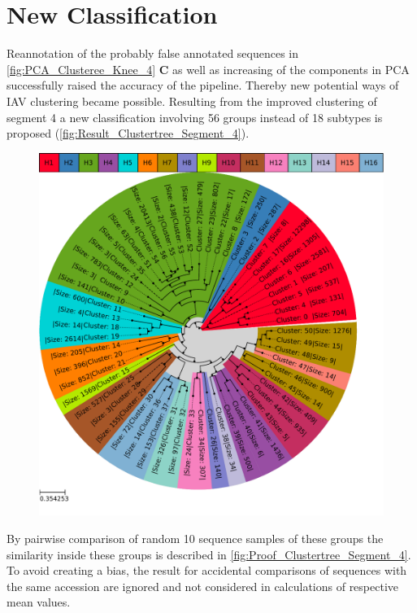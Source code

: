 \section{New Classification} \label{sec:Serotype_Classification}

Reannotation of the probably false annotated sequences in \autoref{fig:PCA_Clusteree_Knee_4} \textbf{\textsf{C}} as well as increasing of the components in \gls{PCA} successfully raised the accuracy of the pipeline. Thereby new potential ways of \gls{IAV} clustering became possible. Resulting from the improved clustering of segment 4 a new classification involving 56 groups instead of 18 subtypes is proposed (\autoref{fig:Result_Clustertree_Segment_4}).

\begin{figure}[hbt]
    \centering
    \includegraphics[width=\textwidth]{Results/Clustertree_Segment_4.pdf}
    \caption[]{}
    \label{fig:Result_Clustertree_Segment_4}
\end{figure}

By pairwise comparison of random 10 sequence samples of these groups the similarity inside these groups is described in \autoref{fig:Proof_Clustertree_Segment_4}. To avoid creating a bias, the result for accidental comparisons of sequences with the same accession are ignored and not considered in calculations of respective mean values.

